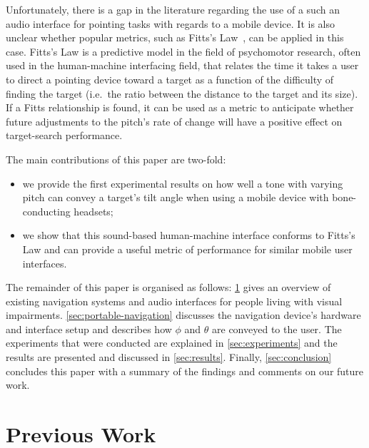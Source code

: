 \documentclass[sigconf, review=true, screen=true, anonymous=true]{acmart}
\begin{document}
Unfortunately, there is a gap in the literature regarding the use of a such an audio interface for pointing tasks with regards to a mobile device.
It is also unclear whether popular metrics, such as Fitts's Law~\cite{fitts1954information}, can be applied in this case.
Fitts's Law is a predictive model in the field of psychomotor research, often used in the human-machine interfacing field, that relates the time it takes a user to direct a pointing device toward a target as a function of the difficulty of finding the target (i.e.\ the ratio between the distance to the target and its size).
If a Fitts relationship is found, it can be used as a metric to anticipate whether future adjustments to the pitch's rate of change will have a positive effect on target-search performance.

The main contributions of this paper are two-fold: 

\begin{itemize}
  \item we provide the first experimental results on how well a tone with varying pitch can convey a target's tilt angle when using a mobile device with bone-conducting headsets; 
  \item we show that this sound-based human-machine interface conforms to Fitts's Law and can provide a useful metric of performance for similar mobile user interfaces.
\end{itemize}

The remainder of this paper is organised as follows: \cref{sec:lit-review} gives an overview of existing navigation systems and audio interfaces for people living with visual impairments.
\cref{sec:portable-navigation} discusses the navigation device's hardware and interface setup and describes how $\phi$ and $\theta$ are conveyed to the user.
The experiments that were conducted are explained in \cref{sec:experiments} and the results are presented and discussed in \cref{sec:results}. 
Finally, \cref{sec:conclusion} concludes this paper with a summary of the findings and comments on our future work. 

\section{Previous Work}\label{sec:lit-review}
\end{document}
